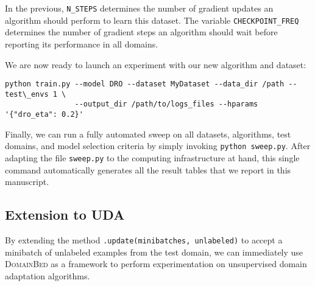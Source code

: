 \documentclass{article}
\newcommand{\domainbed}{\textsc{DomainBed}\xspace}
\begin{document}
\scalebox{0.75}{\usebox{\lstb}}

In the previous, \texttt{N\_STEPS} determines the number of gradient updates an algorithm should perform to learn this dataset.
The variable \texttt{CHECKPOINT\_FREQ} determines the number of gradient steps an algorithm should wait before reporting its performance in all domains.

We are now ready to launch an experiment with our new algorithm and dataset:

\newsavebox{\lstd}
\begin{lrbox}{\lstd}
\begin{lstlisting}
python train.py --model DRO --dataset MyDataset --data_dir /path --test\_envs 1 \
                --output_dir /path/to/logs_files --hparams '{"dro_eta": 0.2}'
\end{lstlisting}
\end{lrbox}

\scalebox{0.75}{\usebox{\lstd}}

Finally, we can run a fully automated sweep on all datasets, algorithms, test domains, and model selection criteria by simply invoking \texttt{python sweep.py}. After adapting the file \texttt{sweep.py} to the computing infrastructure at hand, this single command automatically generates all the result tables that we report in this manuscript. 

\subsection{Extension to UDA}

By extending the method \texttt{.update(minibatches, unlabeled)} to accept a minibatch of unlabeled examples from the test domain, we can immediately use \domainbed as a framework to perform experimentation on unsupervised domain adaptation algorithms.
\end{document}
